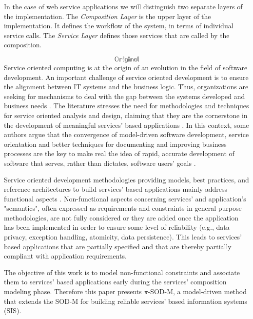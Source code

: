 In the case of web service applications we will distinguish two separate layers of the implementation.
The \textit{Composition Layer} is the upper layer of the implementation. 
It defines the workflow of the system, in terms of individual service calls.
The \textit{Service Layer} defines those services that are called by the composition.

\[ \mathbb{Original} \]
Service oriented computing is at the origin of an evolution in the field of software development. 
An important challenge of service oriented development is  to ensure the alignment between IT systems and the business logic.
Thus, organizations are  seeking for mechanisms to deal with the gap between the systems developed and business needs \cite{bell}. The literature stresses the need for methodologies and techniques for service oriented analysis and design, claiming that they are the cornerstone  in the development of meaningful services' based applications \cite{5}.  In this context, some authors argue that the convergence of model-driven software development, service orientation and better techniques for documenting and improving business processes are the key to make real the idea of rapid, accurate development of software that serves, rather than dictates, software users' goals \cite{watson}. 

Service oriented development methodologies providing models, best practices, and reference architectures to build services' based applications mainly address  functional aspects \cite{1,2,decastro1,PapazoglouH06}.  Non-functional aspects concerning services' and application's "semantics", often expressed as requirements and constraints in general purpose methodologies, are not fully considered or they are added once the application has been implemented in order to ensure some level of reliability (e.g., data privacy, exception handling, atomicity, data persistence). This leads to services' based applications that are partially specified and that are thereby partially compliant with application requirements.

The objective of this work   is to model non-functional constraints and associate them to  services' based applications  early during the services' composition modeling phase. Therefore this paper presents $\pi$-SOD-M, a model-driven method  that extends the SOD-M  \cite{decastro1} for building reliable  services' based information systems (SIS). 

